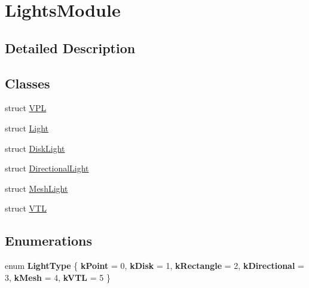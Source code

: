 \hypertarget{group___lights_module}{}\section{Lights\+Module}
\label{group___lights_module}


\subsection{Detailed Description}
\subsection*{Classes}
\begin{DoxyCompactItemize}
\item 
struct \hyperlink{struct_v_p_l}{V\+PL}
\item 
struct \hyperlink{struct_light}{Light}
\item 
struct \hyperlink{struct_disk_light}{Disk\+Light}
\item 
struct \hyperlink{struct_directional_light}{Directional\+Light}
\item 
struct \hyperlink{struct_mesh_light}{Mesh\+Light}
\item 
struct \hyperlink{struct_v_t_l}{V\+TL}
\end{DoxyCompactItemize}
\subsection*{Enumerations}
\begin{DoxyCompactItemize}
\item 
\mbox{\label{group___lights_module_gadc3ec8293e6a97ebe43f0196b9a7f638}} 
enum {\bfseries Light\+Type} \{ \newline
{\bfseries k\+Point} = 0, 
{\bfseries k\+Disk} = 1, 
{\bfseries k\+Rectangle} = 2, 
{\bfseries k\+Directional} = 3, 
\newline
{\bfseries k\+Mesh} = 4, 
{\bfseries k\+V\+TL} = 5
 \}
\end{DoxyCompactItemize}
